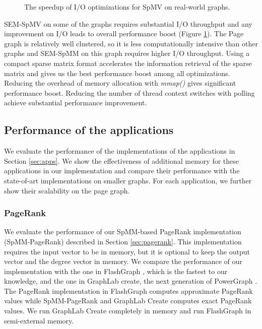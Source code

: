 \begin{figure}
	\begin{center}
		\footnotesize
		
		\caption{The speedup of I/O optimizations for SpMV on real-world graphs.}
		\label{perf:spmm_opt_io}
	\end{center}
\end{figure}

SEM-SpMV on some of the graphs requires substantial I/O throughput and
any improvement on I/O leads to overall performance boost (Figure
\ref{perf:spmm_opt_io}). The Page graph is relatively well clustered, so it is
less computationally intensive than other graphs
and SEM-SpMM on this graph requires higher I/O throughput.
Using a compact sparse matrix format accelerates the information retrieval
of the sparse matrix and gives us the best performance boost among all
optimizations. Reducing the overhead of memory allocation with \textit{mmap()}
gives significant performance boost. Reducing the number of thread context
switches with polling achieve substantial performance improvement. 

\subsection{Performance of the applications}

We evaluate the performance of the implementations of the applications in
Section \ref{sec:apps}. We show the effectiveness of additional memory for
these applications in our implementation and compare their performance
with the state-of-art implementations on smaller graphs. For each application,
we further show their scalability on the page graph.

\subsubsection{PageRank}
We evaluate the performance of our SpMM-based PageRank implementation
(SpMM-PageRank) described
in Section \ref{sec:pagerank}. This implementation requires the input vector
to be in memory, but it is optional to keep the output vector and the degree
vector in memory. We compare the performance of our implementation with
the one in FlashGraph \cite{flashgraph}, which is the fastest to our knowledge,
and the one in GraphLab create, the next generation of
PowerGraph \cite{powergraph}. The PageRank implementation in FlashGraph computes
approximate PageRank values while SpMM-PageRank and GraphLab Create computes
exact PageRank values. We run GraphLab Create completely in memory and run
FlashGraph in semi-external memory.

